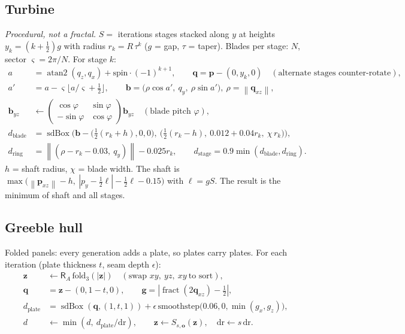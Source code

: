 \documentclass[10pt,a4paper]{article}
\newcommand{\vv}[1]{\mathbf{#1}}
\newcommand{\abs}[1]{\left|#1\right|}
\newcommand{\norm}[1]{\left\lVert#1\right\rVert}
\newcommand{\sdbox}{\operatorname{sdBox}}
\newcommand{\fract}{\operatorname{fract}}
\newcommand{\atantwo}{\operatorname{atan2}}
\newcommand{\Rot}{\mathsf{R}}
\begin{document}
\subsection{Turbine}
\emph{Procedural, not a fractal.} $S=$ iterations stages stacked along $y$ at heights $y_k=(k+\tfrac12)g$ with radius $r_k=R\,\tau^k$ ($g$ = gap, $\tau$ = taper). Blades per stage: $N$, sector $\varsigma=2\pi/N$. For stage $k$:
\begin{align}
a&=\atantwo(q_z,q_x)+\text{spin}\cdot(-1)^{k+1},\qquad\vv q=\vv p-(0,y_k,0)\quad(\text{alternate stages counter-rotate}),\\
a'&=a-\varsigma\lfloor a/\varsigma+\tfrac12\rfloor,\qquad\vv b=\big(\rho\cos a',\ q_y,\ \rho\sin a'\big),\ \rho=\norm{\vv q_{xz}},\\
\vv b_{yz}&\leftarrow\begin{pmatrix}\cos\varphi&\sin\varphi\\-\sin\varphi&\cos\varphi\end{pmatrix}\vv b_{yz}\quad(\text{blade pitch }\varphi),\\
d_{\text{blade}}&=\sdbox\!\Big(\vv b-\big(\tfrac12(r_k+h),0,0\big),\ \big(\tfrac12(r_k-h),\ 0.012+0.04r_k,\ \chi\,r_k\big)\Big),\\
d_{\text{ring}}&=\norm{(\rho-r_k-0.03,\ q_y)}-0.025r_k,\qquad d_{\text{stage}}=0.9\min(d_{\text{blade}},d_{\text{ring}}).
\end{align}
$h$ = shaft radius, $\chi$ = blade width. The shaft is $\max\big(\norm{\vv p_{xz}}-h,\ \abs{p_y-\tfrac12\ell}-\tfrac12\ell-0.15\big)$ with $\ell=gS$. The result is the minimum of shaft and all stages.


\subsection{Greeble hull}
Folded panels: every generation adds a plate, so plates carry plates. For each iteration (plate thickness $t$, seam depth $\epsilon$):
\begin{align}
\vv z&\leftarrow\Rot_A\,\mathrm{fold}_3(\abs{\vv z})\quad(\text{swap }xy,\ yz,\ xy\ \text{to sort}),\\
\vv q&=\vv z-(0,1-t,0),\qquad\vv g=\abs{\fract(2\vv q_{xz})-\tfrac12},\\
d_{\text{plate}}&=\sdbox(\vv q,(1,t,1))+\epsilon\,\mathrm{smoothstep}\!\big(0.06,0,\min(g_x,g_z)\big),\\
d&\leftarrow\min(d,\ d_{\text{plate}}/\mathrm{dr}),\qquad\vv z\leftarrow S_{s,\vv o}(\vv z),\quad\mathrm{dr}\leftarrow s\,\mathrm{dr}.
\end{align}

\end{document}
